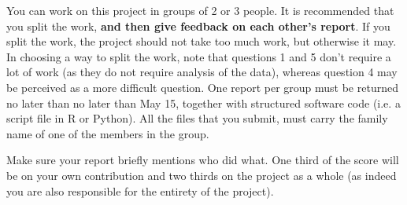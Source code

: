 \documentclass[11pt,fleqn]{article}
\begin{document}
You can work on this project in groups of 2 or 3 people. It is recommended that you split the work, {\bf and then give feedback on each other's report}. If you split the work, the project should not take too much work, but otherwise it may. In choosing a way to split the work, note that questions 1 and 5 don't require a lot of work (as they do not require analysis of the data), whereas question 4 may be perceived as a more difficult question.
One report per group must be returned no later than no later than May 15, together with structured software code (i.e. a script file in R or Python). All the files that you submit, must carry the family name of one of the members in the group. 

Make sure your report briefly mentions who did what. One third of the score will be on your own contribution and two thirds on the project as a whole (as indeed you are also responsible for the entirety of the project).
\end{document}

